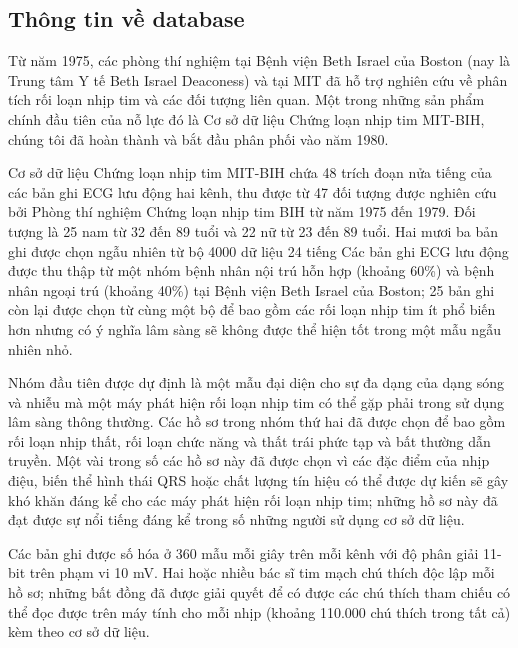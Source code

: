 \subsection{Thông tin về database}
Từ năm 1975, các phòng thí nghiệm tại Bệnh viện Beth Israel của Boston (nay là Trung tâm Y tế Beth Israel Deaconess) và tại MIT đã hỗ trợ nghiên cứu về phân tích rối loạn nhịp tim và các đối tượng liên quan. Một trong những sản phẩm chính đầu tiên của nỗ lực đó là Cơ sở dữ liệu Chứng loạn nhịp tim MIT-BIH, chúng tôi đã hoàn thành và bắt đầu phân phối vào năm 1980.\cite{mitbih}\par
Cơ sở dữ liệu Chứng loạn nhịp tim MIT-BIH chứa 48 trích đoạn nửa tiếng của các bản ghi ECG lưu động hai kênh, thu được từ 47 đối tượng được nghiên cứu bởi Phòng thí nghiệm Chứng loạn nhịp tim BIH từ năm 1975 đến 1979. Đối tượng là 25 nam từ 32 đến 89 tuổi và 22 nữ từ 23 đến 89 tuổi. Hai mươi ba bản ghi được chọn ngẫu nhiên từ bộ 4000 dữ liệu 24 tiếng Các bản ghi ECG lưu động  được thu thập từ một nhóm bệnh nhân nội trú hỗn hợp (khoảng 60\%) và bệnh nhân ngoại trú (khoảng 40\%) tại Bệnh viện Beth Israel của Boston; 25 bản ghi còn lại được chọn từ cùng một bộ để bao gồm các rối loạn nhịp tim ít phổ biến hơn nhưng có ý nghĩa lâm sàng sẽ không được thể hiện tốt trong một mẫu ngẫu nhiên nhỏ.\par
Nhóm đầu tiên được dự định là một mẫu đại diện cho sự đa dạng của dạng sóng và nhiễu mà một máy phát hiện rối loạn nhịp tim có thể gặp phải trong sử dụng lâm sàng thông thường. Các hồ sơ trong nhóm thứ hai đã được chọn để bao gồm rối loạn nhịp thất, rối loạn chức năng và thất trái phức tạp và bất thường dẫn truyền. Một vài trong số các hồ sơ này đã được chọn vì các đặc điểm của nhịp điệu, biến thể hình thái QRS hoặc chất lượng tín hiệu có thể được dự kiến sẽ gây khó khăn đáng kể cho các máy phát hiện rối loạn nhịp tim; những hồ sơ này đã đạt được sự nổi tiếng đáng kể trong số những người sử dụng cơ sở dữ liệu.\par
Các bản ghi được số hóa ở 360 mẫu mỗi giây trên mỗi kênh với độ phân giải 11-bit trên phạm vi 10 mV. Hai hoặc nhiều bác sĩ tim mạch chú thích độc lập mỗi hồ sơ; những bất đồng đã được giải quyết để có được các chú thích tham chiếu có thể đọc được trên máy tính cho mỗi nhịp (khoảng 110.000 chú thích trong tất cả) kèm theo cơ sở dữ liệu.
